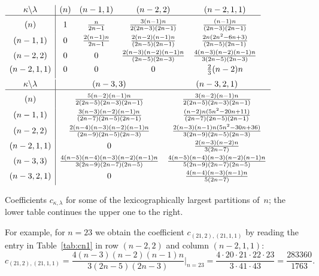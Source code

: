 \documentclass[smallextended]{svjour3}
\begin{document}
\begin{table}
\parbox{0.8\textwidth}{
$
 \begin{array}{c|cccc}
   \kappa\backslash\lambda & (n) & (n-1,1) & (n-2,2) & (n-2,1,1)\\
   \hline \rule{0pt}{14pt}
   (n) & 1 & \frac{n}{2n-1} & \frac{3(n-1)n}{2(2n-3)(2n-1)} & \frac{(n-1)n}{(2n-3)(2n-1)}\\[1ex]
   (n-1,1) & 0 & \frac{2(n-1)n}{2n-1} & \frac{2(n-2)(n-1)n}{(2n-5)(2n-1)} & \frac{2n(2n^{2}-6n+3)}{(2n-5)(2n-1)}\\[1ex]
   (n-2,2) & 0 & 0 & \frac{2(n-3)(n-2)(n-1)n}{(2n-5)(2n-3)} & \frac{4(n-3)(n-2)(n-1)n}{3(2n-5)(2n-3)}\\[1ex]
   (n-2,1,1) & 0 & 0 & 0 & \frac{2}{3}(n-2)n\\[1ex]
 \end{array}
$ \\[1ex]
$
 \begin{array}{c|cc}
   \kappa\backslash\lambda & (n-3,3) & (n-3,2,1)\\
   \hline \rule{0pt}{14pt}
   (n) & \frac{5(n-2)(n-1)n}{2(2n-5)(2n-3)(2n-1)} & \frac{3(n-2)(n-1)n}{2(2n-5)(2n-3)(2n-1)}\\[1ex]
   (n-1,1) & \frac{3(n-3)(n-2)(n-1)n}{(2n-7)(2n-5)(2n-1)} & \frac{(n-2)n(5n^{2}-20n+11)}{(2n-7)(2n-5)(2n-1)}\\[1ex]
   (n-2,2) & \frac{2(n-4)(n-3)(n-2)(n-1)n}{(2n-9)(2n-5)(2n-3)} & \frac{2(n-3)(n-1)n(5n^{2}-30n+36)}{3(2n-9)(2n-5)(2n-3)}\\[1ex]
   (n-2,1,1) & 0 & \frac{2(n-3)(n-2)n}{3(2n-7)}\\[1ex]
   (n-3,3) & \frac{4(n-5)(n-4)(n-3)(n-2)(n-1)n}{3(2n-9)(2n-7)(2n-5)} & \frac{4(n-5)(n-4)(n-3)(n-2)(n-1)n}{5(2n-9)(2n-7)(2n-5)}\\[1ex]
   (n-3,2,1) & 0 & \frac{4(n-4)(n-3)(n-1)n}{5(2n-7)}\\[1ex]
 \end{array}
$ \\[1ex]
}
\caption{Coefficients $c_{\kappa,\lambda}$ for some of the lexicographically
largest partitions of~$n$; the lower table continues the upper one
to the right.}
\label{tab:cn1} 
\end{table}
\begin{example}
For example, for $n=23$ we obtain the coefficient $c_{(21,2),(21,1,1)}$ by
reading the entry in Table~\ref{tab:cn1} in row $(n-2,2)$ and column
$(n-2,1,1)$:
\[
  c_{(21,2),(21,1,1)} = \frac{4 (n-3) (n-2) (n-1) n}{3 (2 n-5) (2 n-3)} \Bigg|_{n=23}
  = \frac{4 \cdot 20 \cdot 21 \cdot 22 \cdot 23}{3 \cdot 41 \cdot 43}
  = \frac{283360}{1763}.
\]
\end{example}
\end{document}
